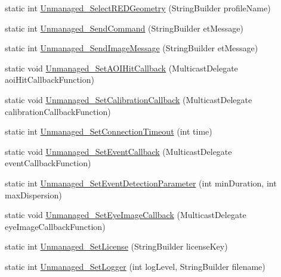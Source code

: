 \begin{DoxyCompactItemize}
\item 
static int \hyperlink{class_web_analyzer_1_1_eye_tracking_1_1_eye_tracking_controller_a92f9c78ad26abe9e543eb6ac2243fd0f}{Unmanaged\+\_\+\+Select\+R\+E\+D\+Geometry} (String\+Builder profile\+Name)
\item 
static int \hyperlink{class_web_analyzer_1_1_eye_tracking_1_1_eye_tracking_controller_a9ba64cfae2b8e77504efb10a421cc583}{Unmanaged\+\_\+\+Send\+Command} (String\+Builder et\+Message)
\item 
static int \hyperlink{class_web_analyzer_1_1_eye_tracking_1_1_eye_tracking_controller_af32242309e4acf01edbc0ab23c00745d}{Unmanaged\+\_\+\+Send\+Image\+Message} (String\+Builder et\+Message)
\item 
static void \hyperlink{class_web_analyzer_1_1_eye_tracking_1_1_eye_tracking_controller_aa026c0dc5aa41edc01fe629a908f09f0}{Unmanaged\+\_\+\+Set\+A\+O\+I\+Hit\+Callback} (Multicast\+Delegate aoi\+Hit\+Callback\+Function)
\item 
static void \hyperlink{class_web_analyzer_1_1_eye_tracking_1_1_eye_tracking_controller_a6ec6f01eafdb0588d1d12fcf4a0b361f}{Unmanaged\+\_\+\+Set\+Calibration\+Callback} (Multicast\+Delegate calibration\+Callback\+Function)
\item 
static int \hyperlink{class_web_analyzer_1_1_eye_tracking_1_1_eye_tracking_controller_afcccfac459b70c464d14bf6a8da2f75f}{Unmanaged\+\_\+\+Set\+Connection\+Timeout} (int time)
\item 
static void \hyperlink{class_web_analyzer_1_1_eye_tracking_1_1_eye_tracking_controller_afbea3b575ad8377bb8ab538bcee62fdf}{Unmanaged\+\_\+\+Set\+Event\+Callback} (Multicast\+Delegate event\+Callback\+Function)
\item 
static int \hyperlink{class_web_analyzer_1_1_eye_tracking_1_1_eye_tracking_controller_aa40d32493a0e03bb7d2c6fb4efadbbb3}{Unmanaged\+\_\+\+Set\+Event\+Detection\+Parameter} (int min\+Duration, int max\+Dispersion)
\item 
static void \hyperlink{class_web_analyzer_1_1_eye_tracking_1_1_eye_tracking_controller_a02a912e15ef24a6b2def5343b70cb13e}{Unmanaged\+\_\+\+Set\+Eye\+Image\+Callback} (Multicast\+Delegate eye\+Image\+Callback\+Function)
\item 
static int \hyperlink{class_web_analyzer_1_1_eye_tracking_1_1_eye_tracking_controller_aab6e6d5314f43d1078e7c6740917a396}{Unmanaged\+\_\+\+Set\+License} (String\+Builder license\+Key)
\item 
static int \hyperlink{class_web_analyzer_1_1_eye_tracking_1_1_eye_tracking_controller_a66332cb2e6d6b68f4ed9cc72b6630057}{Unmanaged\+\_\+\+Set\+Logger} (int log\+Level, String\+Builder filename)

\end{DoxyCompactItemize}
